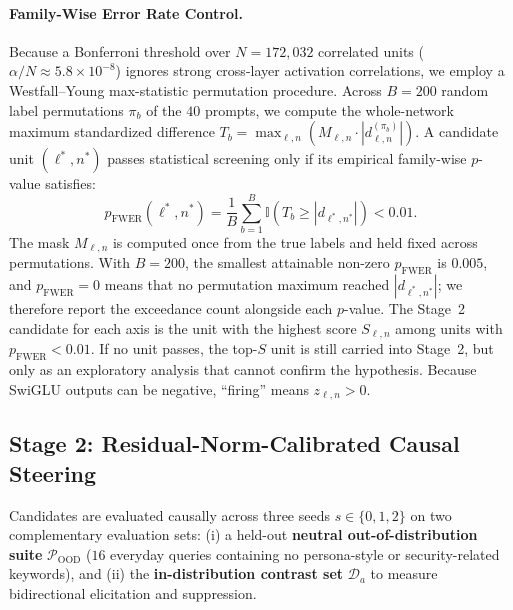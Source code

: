\documentclass[11pt, a4paper]{article}
\begin{document}
\paragraph{Family-Wise Error Rate Control.} Because a Bonferroni threshold over $N = 172{,}032$ correlated units ($\alpha / N \approx 5.8 \times 10^{-8}$) ignores strong cross-layer activation correlations, we employ a Westfall--Young max-statistic permutation procedure. Across $B = 200$ random label permutations $\pi_b$ of the $40$ prompts, we compute the whole-network maximum standardized difference $T_b = \max_{\ell,n} \left(M_{\ell,n} \cdot |d_{\ell,n}^{(\pi_b)}|\right)$. A candidate unit $(\ell^*, n^*)$ passes statistical screening only if its empirical family-wise $p$-value satisfies:
\begin{equation}\label{eq:pfwer}
    p_{\mathrm{FWER}}(\ell^*, n^*) = \frac{1}{B} \sum_{b=1}^{B} \mathbb{I}\!\left(T_b \ge |d_{\ell^*, n^*}|\right) < 0.01.
\end{equation}
The mask $M_{\ell,n}$ is computed once from the true labels and held fixed across permutations. With $B = 200$, the smallest attainable non-zero $p_{\mathrm{FWER}}$ is $0.005$, and $p_{\mathrm{FWER}} = 0$ means that no permutation maximum reached $|d_{\ell^*, n^*}|$; we therefore report the exceedance count alongside each $p$-value. The Stage~2 candidate for each axis is the unit with the highest score $S_{\ell,n}$ among units with $p_{\mathrm{FWER}} < 0.01$. If no unit passes, the top-$S$ unit is still carried into Stage~2, but only as an exploratory analysis that cannot confirm the hypothesis. Because SwiGLU outputs can be negative, ``firing'' means $z_{\ell,n} > 0$.

\subsection{Stage 2: Residual-Norm-Calibrated Causal Steering}
\label{sec:stage2}

Candidates are evaluated causally across three seeds $s \in \{0, 1, 2\}$ on two complementary evaluation sets: (i) a held-out \textbf{neutral out-of-distribution suite} $\mathcal{P}_{\mathrm{OOD}}$ ($16$ everyday queries containing no persona-style or security-related keywords), and (ii) the \textbf{in-distribution contrast set} $\mathcal{D}_a$ to measure bidirectional elicitation and suppression.
\end{document}
